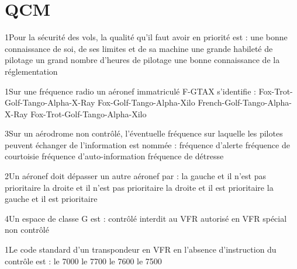 \appendix 
\section{QCM}
{1}{Pour la sécurité des vols, la qualité qu'il faut avoir en priorité est :}
{une bonne connaissance de soi, de ses limites et de sa machine}
{une grande habileté de pilotage}
{un grand nombre d'heures de pilotage}
{une bonne connaissance de la réglementation} 
{}


{1}{Sur une fréquence radio un aéronef immatriculé F-GTAX s'identifie : }
{Fox-Trot-Golf-Tango-Alpha-X-Ray}
{Fox-Golf-Tango-Alpha-Xilo}
{French-Golf-Tango-Alpha-X-Ray}
{Fox-Trot-Golf-Tango-Alpha-Xilo} 
{} 

{3}{Sur un aérodrome non contrôlé, l'éventuelle fréquence sur laquelle les pilotes peuvent échanger de l'information est nommée : }
{fréquence d'alerte}
{fréquence de courtoisie}
{fréquence d'auto-information}
{fréquence de détresse} 
{} 

{2}{Un aéronef doit dépasser un autre aéronef par : }
{la gauche et il n'est pas prioritaire}
{la droite et il n'est pas prioritaire}
{la droite et il est prioritaire}
{la gauche et il est prioritaire} 
{} 

{4}{Un espace de classe G est :}
{contrôlé}
{interdit au VFR}
{autorisé en VFR spécial} 
{non contrôlé}
{} 

{1}{Le code standard d'un transpondeur en VFR en l'absence d'instruction du contrôle est : }
{le 7000}
{le 7700}
{le 7600}
{le 7500} 
{} 
 
 
 

